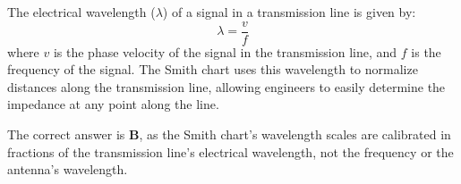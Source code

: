 The electrical wavelength (\(\lambda\)) of a signal in a transmission line is given by:
\[
\lambda = \frac{v}{f}
\]
where \(v\) is the phase velocity of the signal in the transmission line, and \(f\) is the frequency of the signal. The Smith chart uses this wavelength to normalize distances along the transmission line, allowing engineers to easily determine the impedance at any point along the line.

The correct answer is \textbf{B}, as the Smith chart's wavelength scales are calibrated in fractions of the transmission line's electrical wavelength, not the frequency or the antenna's wavelength.

